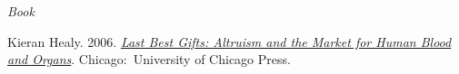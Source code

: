 \documentclass[11pt]{article}
\begin{document}
\bigskip
 
\medskip
\noindent\emph{Book \vspace{0.01in}}

\ind  Kieran Healy. 2006. \emph{\href{http://www.lastbestgifts.com}{Last Best Gifts: Altruism and the Market for Human Blood and Organs}}. Chicago:~University of Chicago Press. \vspace{-0.075in}

\end{document}

